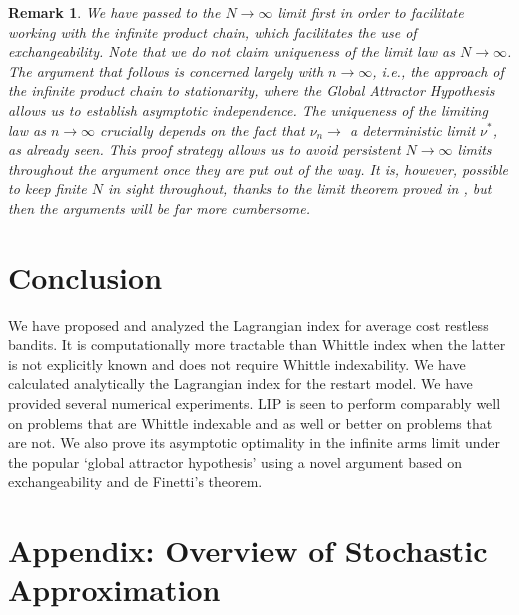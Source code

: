\documentclass[12pt]{article}
\newtheorem{remark}[theorem]{Remark}
\numberwithin{equation}{section}
\newcommand{\1}{\textbf{1}}
\begin{document}
\begin{remark} We have passed to the $N\to\infty$ limit first in order to facilitate working with the infinite product chain, which facilitates the use of exchangeability. 
 Note that we do not claim uniqueness of the limit law as $N\to\infty$.
The argument that follows is concerned largely with $n\to\infty$, i.e., the approach of the infinite product chain to stationarity, where the Global Attractor Hypothesis allows us to establish asymptotic independence. The uniqueness of the limiting law as $n \to \infty$ crucially depends on the fact that $\nu_n \to$ a deterministic limit $\nu^*$, as already seen. This proof strategy allows us to avoid persistent  $N\to\infty$ limits throughout the argument once they are put out of the way. It is, however, possible to keep finite $N$ in sight throughout, thanks to the limit theorem proved in \cite{Diaconis}, but then the arguments will be far more cumbersome. 
\end{remark}


\section{Conclusion}
\label{sec:concl}

We have proposed and analyzed the Lagrangian index for average cost restless bandits. 
It is computationally more tractable than Whittle index when the latter is not explicitly known 
and does not require Whittle indexability. We have calculated analytically the Lagrangian index
for the restart model. We have provided several numerical experiments. LIP is seen to perform 
comparably well on problems that are Whittle indexable and as well or better on problems that are not. 
We also prove its asymptotic optimality in the infinite arms limit under the popular `global 
attractor hypothesis' using a novel argument based on exchangeability and de Finetti's theorem.

\bigskip


\section{Appendix: Overview of Stochastic Approximation}
\end{document}
